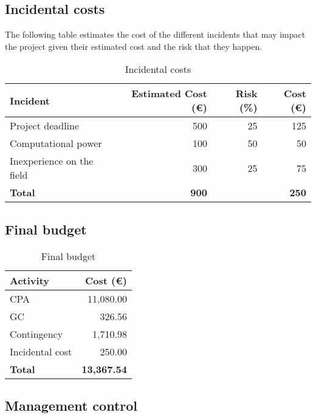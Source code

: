 \subsection{Incidental costs}

The following table estimates the cost of the different incidents that may
impact the project given their estimated cost and the risk that they happen.

\begin{table}[H]
    \centering
    \caption{Incidental costs}\label{tab:inc}
    \begin{tabular}{lrrr}
        \toprule
        Incident & Estimated Cost (€) & Risk (\%) & Cost (€) \\
        \midrule
        Project deadline & 500 & 25 & 125 \\
        Computational power & 100 & 50 & 50 \\
        Inexperience on the field & 300 & 25 & 75 \\
        \addlinespace[0.5em]
    \textbf{Total} & \textbf{900} & & \textbf{250} \\
        \bottomrule
    \end{tabular}
\end{table}


\subsection{Final budget}

\begin{table}[H]
    \centering
    \caption{Final budget}\label{tab:pay}
    \begin{tabular}{lr}
        \toprule
        Activity & Cost (€) \\
        \midrule
        CPA & 11,080.00 \\
        GC & 326.56 \\
        Contingency & 1,710.98 \\
        Incidental cost & 250.00 \\
        \addlinespace[0.5em]
        \textbf{Total} & \textbf{13,367.54} \\
        \bottomrule
    \end{tabular}
\end{table}

\pagebreak
\subsection{Management control}

